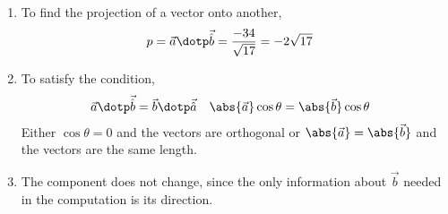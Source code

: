\begin{enumerate}
      \item To find the projection of a vector onto another,
            \begin{align}
                  p & = \vec{a} \dotp \vec{\hat{b}} = \frac{-34}{\sqrt{17}}
                  = -2\sqrt{17}
            \end{align}

      \item To satisfy the condition,
            \begin{align}
                  \vec{a} \dotp \vec{\hat{b}} & = \vec{b} \dotp \vec{\hat{a}} &
                  \abs{\vec{a}}\cos \theta    & = \abs{\vec{b}} \cos \theta
            \end{align}
            Either $ \cos \theta = 0 $ and the vectors are orthogonal or
            $ \abs{\vec{a}} = \abs{\vec{b}} $ and the vectors are the same length.

      \item The component does not change, since the only information about $ \vec{b} $
            needed in the computation is its direction.
\end{enumerate}